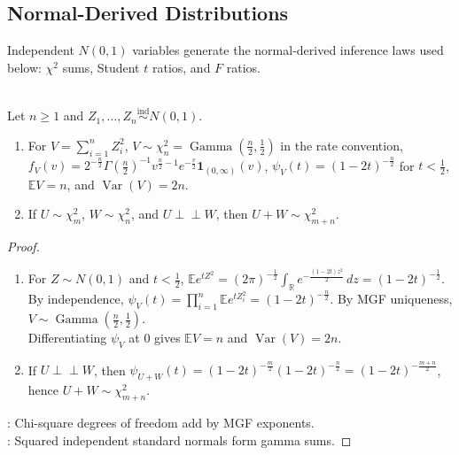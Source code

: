 \subsection{Normal-Derived Distributions}

Independent $N(0,1)$ variables generate the normal-derived inference laws used below: $\chi^2$ sums, Student $t$ ratios, and $F$ ratios.

\begin{proposition} \label{prop:chi-square-normal-sums} \\
Let $n\geq1$ and $Z_1,\ldots,Z_n\overset{\mathrm{ind}}{\sim}N(0,1)$.
\begin{enumerate}[label=(\roman*)]
\setlength{\itemsep}{0pt}
\item For $V=\sum\limits_{i=1}^nZ_i^2$, $V\sim\chi_n^2=\operatorname{Gamma}(\frac{n}{2},\frac{1}{2})$ in the rate convention,\\
$f_V(v)=2^{-\frac{n}{2}}\Gamma(\frac{n}{2})^{-1}v^{\frac{n}{2}-1}e^{-\frac{v}{2}}\mathbf{1}_{(0,\infty)}(v)$, $\psi_V(t)=(1-2t)^{-\frac{n}{2}}$ for $t<\frac{1}{2}$, $\mathbb{E}V=n$, and $\operatorname{Var}(V)=2n$.
\item If $U\sim\chi_m^2$, $W\sim\chi_n^2$, and $U\perp\!\!\!\perp W$, then $U+W\sim\chi_{m+n}^2$.
\end{enumerate}
\begin{proof}
\begin{enumerate}[label=(\roman*)]
\setlength{\itemsep}{0pt}
\item
For $Z\sim N(0,1)$ and $t<\frac{1}{2}$, $\mathbb{E}e^{tZ^2}=(2\pi)^{-\frac{1}{2}}\int_{\mathbb{R}}e^{-\frac{(1-2t)z^2}{2}}\,dz=(1-2t)^{-\frac{1}{2}}$.\\
By independence, $\psi_V(t)=\prod\limits_{i=1}^n\mathbb{E}e^{tZ_i^2}=(1-2t)^{-\frac{n}{2}}$.
By MGF uniqueness, $V\sim\operatorname{Gamma}(\frac{n}{2},\frac{1}{2})$.\\
Differentiating $\psi_V$ at $0$ gives $\mathbb{E}V=n$ and $\operatorname{Var}(V)=2n$.
\item If $U\perp\!\!\!\perp W$, then $\psi_{U+W}(t)=(1-2t)^{-\frac{m}{2}}(1-2t)^{-\frac{n}{2}}=(1-2t)^{-\frac{m+n}{2}}$, hence $U+W\sim\chi_{m+n}^2$.
\end{enumerate}
: Chi-square degrees of freedom add by MGF exponents.\\
: Squared independent standard normals form gamma sums.
\end{proof}
\end{proposition}

